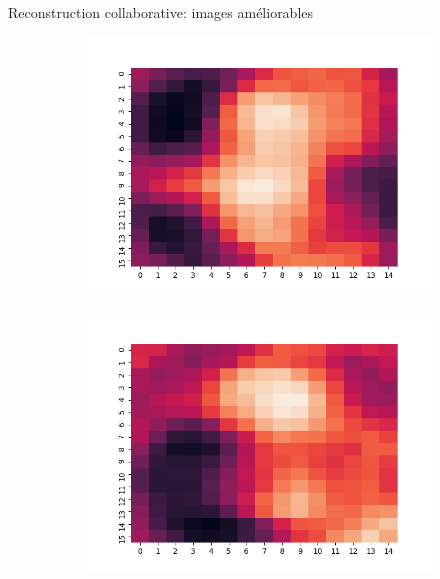 \documentclass[hyperref={pdfpagelabels=false}]{beamer}
\begin{document}
    \begin{frame}{Reconstruction collaborative: images améliorables}
        \begin{figure}[h]
            \centering
            \begin{subfigure}[c]{0.18\textwidth}
                \includegraphics[scale=.12]{00}
            \end{subfigure}
            \begin{subfigure}[c]{0.18\textwidth}
                \includegraphics[scale=.12]{11}
            \end{subfigure}
            \begin{subfigure}[c]{0.18\textwidth}

\end{subfigure}
\end{figure}
\end{frame}
\end{document}
